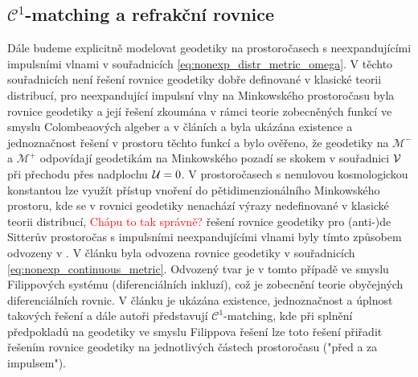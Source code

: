 \subsection{$\mathcal{C}^1$-matching a refrakční rovnice}
Dále budeme explicitně modelovat geodetiky na prostoročasech s neexpandujícími impulsními vlnami v souřadnicích
\eqref{eq:nonexp_distr_metric_omega}. V těchto souřadnicích není řešení rovnice geodetiky dobře definované v
klasické teorii distribucí, pro neexpandující impulsní vlny na Minkowského prostoročasu byla rovnice geodetiky
a její řešení zkoumána v rámci teorie zobecněných funkcí ve smyslu Colombeaových algeber a v článích \cite{Steinbauer_1998} a \cite{Kunzinger_1999}
byla ukázána existence a jednoznačnost řešení v prostoru těchto funkcí a bylo ověřeno, že geodetiky na $\mathcal{M}^-$ a $\mathcal{M}^+$ odpovídají
geodetikám na Minkowského pozadí se skokem v souřadnici $\mathcal{V}$ při přechodu přes nadplochu $\mathcal{U}=0$. V prostoročasech s
nenulovou kosmologickou konstantou lze využít přístup vnoření do pětidimenzionálního Minkowského prostoru, kde se v rovnici
geodetiky nenachází výrazy nedefinované v klasické teorii distribucí, \textcolor{red}{Chápu to tak správně?} řešení rovnice geodetiky
pro (anti-)de Sitterův prostoročas s impulsními neexpandujícími vlnami byly tímto způsobem odvozeny v \cite{Podolsk__2001}.
V článku \cite{Podolsky:2014ysa} byla odvozena rovnice geodetiky v souřadnicích \eqref{eq:nonexp_continuous_metric}.
Odvozený tvar je v tomto případě ve smyslu Filippových systému (diferenciálních inkluzí), což je zobecnění teorie obyčejných diferenciálních rovnic.
V článku je ukázána existence, jednoznačnost a úplnost takových řešení a dále autoři představují $\mathcal{C}^1$-matching,
kde při splnění předpokladů na geodetiky ve smyslu Filippova řešení lze toto řešení přiřadit řešením rovnice geodetiky na jednotlivých částech prostoročasu
("před a za impulsem").

